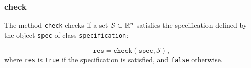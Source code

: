 \subsubsection{check}

The method \texttt{check} checks if a set $\mathcal{S} \subset \mathbb{R}^n$ satisfies the specification defined by the object \texttt{spec} of class \texttt{specification}:

\begin{equation*}
	\texttt{res} = \texttt{check}(\texttt{spec},\mathcal{S}),
\end{equation*}
where \texttt{res} is \texttt{true} if the specification is satisfied, and \texttt{false} otherwise.
